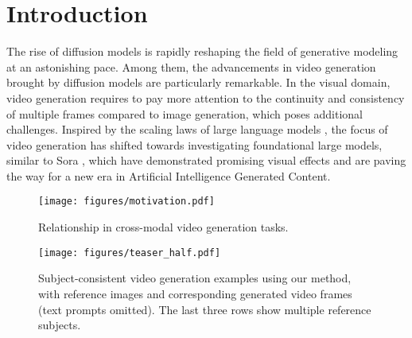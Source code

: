 \section{Introduction}
\label{sec:intro}

The rise of diffusion models \cite{peebles2023scalable, ho2020denoising} is rapidly reshaping the field of generative modeling at an astonishing pace. Among them, the advancements in video generation brought by diffusion models are particularly remarkable. 
In the visual domain, video generation requires to pay more attention to the continuity and consistency of multiple frames compared to image generation, which poses additional challenges. 
Inspired by the scaling laws of large language models \cite{GPT4, touvron2023llama, yang2024qwen2}, the focus of video generation has shifted towards investigating foundational large models, similar to Sora \cite{OpenAI2023Sora, polyak2024movie, yang2024cogvideox, kong2024hunyuanvideo, zheng2024open}, which have demonstrated promising visual effects and are paving the way for a new era in Artificial Intelligence Generated Content. 


\begin{figure}[t]
	\centering
	\texttt{[image: figures/motivation.pdf]}
	\caption{
		Relationship in cross-modal video generation tasks.
	}
	\label{fig:motivation}
\end{figure}

\begin{figure*}[h]
	\centering
	\texttt{[image: figures/teaser\_half.pdf]}
	\caption{
		Subject-consistent video generation examples using our method, with reference images and corresponding generated video frames (text prompts omitted). The last three rows show multiple reference subjects.}
	\label{fig:teaser}
\end{figure*}

